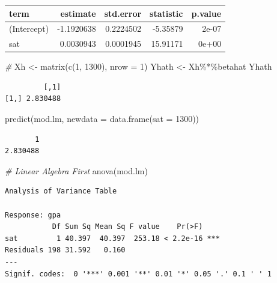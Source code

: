 \documentclass[
]{article}
\newenvironment{Shaded}{\begin{snugshade}}{\end{snugshade}}
\newcommand{\AttributeTok}[1]{\textcolor[rgb]{0.77,0.63,0.00}{#1}}
\newcommand{\CommentTok}[1]{\textcolor[rgb]{0.56,0.35,0.01}{\textit{#1}}}
\newcommand{\DecValTok}[1]{\textcolor[rgb]{0.00,0.00,0.81}{#1}}
\newcommand{\FunctionTok}[1]{\textcolor[rgb]{0.00,0.00,0.00}{#1}}
\newcommand{\NormalTok}[1]{#1}
\newcommand{\OtherTok}[1]{\textcolor[rgb]{0.56,0.35,0.01}{#1}}
\newcommand{\SpecialCharTok}[1]{\textcolor[rgb]{0.00,0.00,0.00}{#1}}
\begin{document}
\begin{tabular}{l|r|r|r|r}
\hline
term & estimate & std.error & statistic & p.value\\
\hline
(Intercept) & -1.1920638 & 0.2224502 & -5.35879 & 2e-07\\
\hline
sat & 0.0030943 & 0.0001945 & 15.91171 & 0e+00\\
\hline
\end{tabular}

\begin{Shaded}
\begin{Highlighting}[]
\CommentTok{\#}
\NormalTok{Xh }\OtherTok{\textless{}{-}} \FunctionTok{matrix}\NormalTok{(}\FunctionTok{c}\NormalTok{(}\DecValTok{1}\NormalTok{, }\DecValTok{1300}\NormalTok{), }\AttributeTok{nrow =} \DecValTok{1}\NormalTok{)}
\NormalTok{Yhath }\OtherTok{\textless{}{-}}\NormalTok{ Xh}\SpecialCharTok{\%*\%}\NormalTok{betahat}
\NormalTok{Yhath}
\end{Highlighting}
\end{Shaded}

\begin{verbatim}
         [,1]
[1,] 2.830488
\end{verbatim}

\begin{Shaded}
\begin{Highlighting}[]
\FunctionTok{predict}\NormalTok{(mod.lm, }\AttributeTok{newdata =} \FunctionTok{data.frame}\NormalTok{(}\AttributeTok{sat =} \DecValTok{1300}\NormalTok{))}
\end{Highlighting}
\end{Shaded}

\begin{verbatim}
       1 
2.830488 
\end{verbatim}

\begin{Shaded}
\begin{Highlighting}[]
\CommentTok{\# Linear Algebra First}
\FunctionTok{anova}\NormalTok{(mod.lm)}
\end{Highlighting}
\end{Shaded}

\begin{verbatim}
Analysis of Variance Table

Response: gpa
           Df Sum Sq Mean Sq F value    Pr(>F)    
sat         1 40.397  40.397  253.18 < 2.2e-16 ***
Residuals 198 31.592   0.160                      
---
Signif. codes:  0 '***' 0.001 '**' 0.01 '*' 0.05 '.' 0.1 ' ' 1
\end{verbatim}
\end{document}
